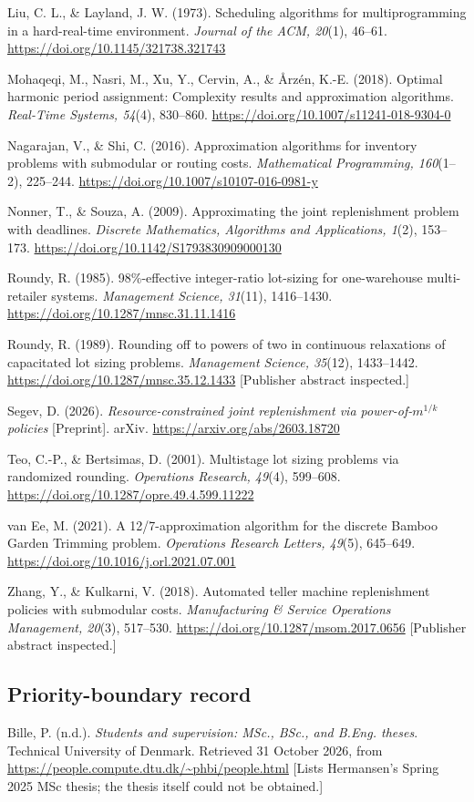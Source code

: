 \documentclass[
  british,
  11pt,
  a4paper,
]{article}
\begin{document}
Liu, C. L., \& Layland, J. W. (1973). Scheduling algorithms for
multiprogramming in a hard-real-time environment. \emph{Journal of the
ACM, 20}(1), 46--61. \url{https://doi.org/10.1145/321738.321743}

Mohaqeqi, M., Nasri, M., Xu, Y., Cervin, A., \& Årzén, K.-E. (2018).
Optimal harmonic period assignment: Complexity results and approximation
algorithms. \emph{Real-Time Systems, 54}(4), 830--860.
\url{https://doi.org/10.1007/s11241-018-9304-0}

Nagarajan, V., \& Shi, C. (2016). Approximation algorithms for inventory
problems with submodular or routing costs. \emph{Mathematical
Programming, 160}(1--2), 225--244.
\url{https://doi.org/10.1007/s10107-016-0981-y}

Nonner, T., \& Souza, A. (2009). Approximating the joint replenishment
problem with deadlines. \emph{Discrete Mathematics, Algorithms and
Applications, 1}(2), 153--173.
\url{https://doi.org/10.1142/S1793830909000130}

Roundy, R. (1985). 98\%-effective integer-ratio lot-sizing for
one-warehouse multi-retailer systems. \emph{Management Science, 31}(11),
1416--1430. \url{https://doi.org/10.1287/mnsc.31.11.1416}

Roundy, R. (1989). Rounding off to powers of two in continuous
relaxations of capacitated lot sizing problems. \emph{Management
Science, 35}(12), 1433--1442.
\url{https://doi.org/10.1287/mnsc.35.12.1433} {[}Publisher abstract
inspected.{]}

Segev, D. (2026). \emph{Resource-constrained joint replenishment via
power-of-\(m^{1/k}\) policies} {[}Preprint{]}. arXiv.
\url{https://arxiv.org/abs/2603.18720}

Teo, C.-P., \& Bertsimas, D. (2001). Multistage lot sizing problems via
randomized rounding. \emph{Operations Research, 49}(4), 599--608.
\url{https://doi.org/10.1287/opre.49.4.599.11222}

van Ee, M. (2021). A 12/7-approximation algorithm for the discrete
Bamboo Garden Trimming problem. \emph{Operations Research Letters,
49}(5), 645--649. \url{https://doi.org/10.1016/j.orl.2021.07.001}

Zhang, Y., \& Kulkarni, V. (2018). Automated teller machine
replenishment policies with submodular costs. \emph{Manufacturing \&
Service Operations Management, 20}(3), 517--530.
\url{https://doi.org/10.1287/msom.2017.0656} {[}Publisher abstract
inspected.{]}

\subsection{Priority-boundary record}\label{priority-boundary-record}

Bille, P. (n.d.). \emph{Students and supervision: MSc., BSc., and B.Eng.
theses}. Technical University of Denmark. Retrieved 31 October 2026,
from \url{https://people.compute.dtu.dk/~phbi/people.html} {[}Lists
Hermansen's Spring 2025 MSc thesis; the thesis itself could not be
obtained.{]}
\end{document}
